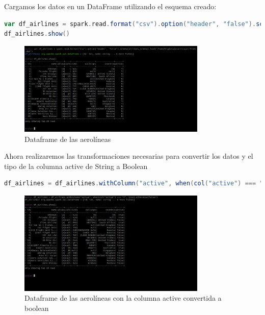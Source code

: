 Cargamos los datos en un DataFrame utilizando el esquema creado:

\begin{lstlisting}[language=scala]
var df_airlines = spark.read.format("csv").option("header", "false").schema(airlines_schema).load("/home/bigdata/practica/airlines.dat")
df_airlines.show()
\end{lstlisting}

\begin{figure}[H]
    \centering
    \includegraphics[width=0.8\textwidth]{figures/35.png}
    \caption{Dataframe de las aerolíneas}
    \label{fig:airlines_df}
\end{figure}

Ahora realizaremos las transformaciones necesarias para convertir los datos y el tipo de la columna active de String a Boolean

\begin{lstlisting}[language=scala]
    df_airlines = df_airlines.withColumn("active", when(col("active") === "Y", true).otherwise(false))
\end{lstlisting}

\begin{figure}[H]
    \centering
    \includegraphics[width=0.8\textwidth]{figures/36.png}
    \caption{Dataframe de las aerolíneas con la columna active convertida a boolean}
    \label{fig:airlines_df_active}
\end{figure}

